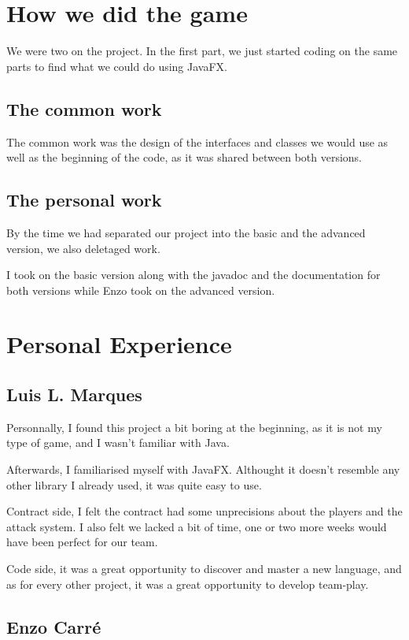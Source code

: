 \documentclass[12pt, a4paper]{report}
\begin{document}
\section*{How we did the game}

We were two on the project. In the first part, we just started coding on the same parts to find what we could do using JavaFX.

\subsection*{The common work}

The common work was the design of the interfaces and classes we would use as well as the beginning of the code, as it was shared between both versions.

\subsection*{The personal work}

By the time we had separated our project into the basic and the advanced version, we also deletaged work.

I took on the basic version along with the javadoc and the documentation for both versions while Enzo took on the advanced version.

\section*{Personal Experience}

\subsection*{Luis L. Marques}

Personnally, I found this project a bit boring at the beginning, as it is not my type of game, and I wasn't familiar with Java.

Afterwards, I familiarised myself with JavaFX. Althought it doesn't resemble any other library I already used, it was quite easy to use.

Contract side, I felt the contract had some unprecisions about the players and the attack system. I also felt we lacked a bit of time, one or two more weeks would have been perfect for our team.

Code side, it was a great opportunity to discover and master a new language, and as for every other project, it was a great opportunity to develop team-play.

\subsection*{Enzo Carré}
\end{document}
